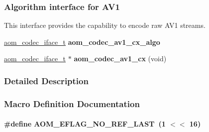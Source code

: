 \subsubsection*{Algorithm interface for A\+V1}
\label{_amgrp8c574bd9a585a04008b0d15257056884}%
This interface provides the capability to encode raw A\+V1 streams. \begin{DoxyCompactItemize}
\item 
\hyperlink{group__codec_ga4ef55b44c762836d1550e11921bed403}{aom\+\_\+codec\+\_\+iface\+\_\+t} {\bfseries aom\+\_\+codec\+\_\+av1\+\_\+cx\+\_\+algo}\hypertarget{group__aom__encoder_ga18350b1c0642494e2b1a970104b2e8b9}{}\label{group__aom__encoder_ga18350b1c0642494e2b1a970104b2e8b9}

\item 
\hyperlink{group__codec_ga4ef55b44c762836d1550e11921bed403}{aom\+\_\+codec\+\_\+iface\+\_\+t} $\ast$ {\bfseries aom\+\_\+codec\+\_\+av1\+\_\+cx} (void)\hypertarget{group__aom__encoder_ga5b742eec203f55a95cc404f41c0166d8}{}\label{group__aom__encoder_ga5b742eec203f55a95cc404f41c0166d8}

\end{DoxyCompactItemize}


\subsubsection{Detailed Description}


\subsubsection{Macro Definition Documentation}
\paragraph[{\texorpdfstring{A\+O\+M\+\_\+\+E\+F\+L\+A\+G\+\_\+\+N\+O\+\_\+\+R\+E\+F\+\_\+\+L\+A\+ST}{AOM_EFLAG_NO_REF_LAST}}]{\setlength{\rightskip}{0pt plus 5cm}\#define A\+O\+M\+\_\+\+E\+F\+L\+A\+G\+\_\+\+N\+O\+\_\+\+R\+E\+F\+\_\+\+L\+A\+ST~(1 $<$$<$ 16)}\hypertarget{group__aom__encoder_gae272ed6e69ae2a12993565e8176d004b}{}\label{group__aom__encoder_gae272ed6e69ae2a12993565e8176d004b}


